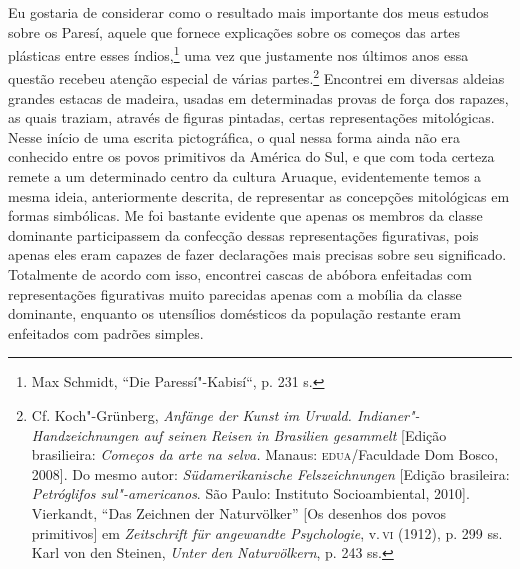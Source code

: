 Eu gostaria de considerar como o resultado mais importante dos meus
estudos sobre os Paresí, aquele que fornece explicações sobre os
começos das artes plásticas entre esses índios,\footnote{Max Schmidt,
  ``Die Paressí"-Kabisí``, p. 231 s.} uma vez que justamente nos últimos
anos essa questão recebeu atenção especial de várias partes.\footnote{Cf.
  Koch"-Grünberg, \emph{Anfänge der Kunst im Urwald.
  Indianer"-Handzeichnungen auf seinen Reisen in Brasilien gesammelt}
  {[}Edição brasilieira: \emph{Começos da arte na selva.} Manaus:
  \textsc{edua}/Faculdade Dom Bosco, 2008{]}. Do mesmo autor:
  \emph{Südamerikanische Felszeichnungen} {[}Edição brasileira:
  \emph{Petróglifos sul"-americanos}. São Paulo: Instituto
  Socioambiental, 2010{]}. Vierkandt, ``Das Zeichnen der Naturvölker''
  {[}Os desenhos dos povos primitivos{]} em \emph{Zeitschrift für
  angewandte Psychologie}, v.\,\textsc{vi} (1912), p. 299 ss. Karl von den
  Steinen, \emph{Unter den Naturvölkern}, p. 243 ss.} Encontrei em
diversas aldeias grandes estacas de madeira, usadas em determinadas
provas de força dos rapazes, as quais traziam, através de figuras
pintadas, certas representações mitológicas. Nesse início de uma escrita
pictográfica, o qual nessa forma ainda não era conhecido entre os povos
primitivos da América do Sul, e que com toda certeza remete a um
determinado centro da cultura Aruaque, evidentemente temos a mesma
ideia, anteriormente descrita, de representar as concepções mitológicas
em formas simbólicas. Me foi bastante evidente que apenas os membros da
classe dominante participassem da confecção dessas representações
figurativas, pois apenas eles eram capazes de fazer declarações mais
precisas sobre seu significado. Totalmente de acordo com isso, encontrei
cascas de abóbora enfeitadas com representações figurativas muito
parecidas apenas com a mobília da classe dominante, enquanto os
utensílios domésticos da população restante eram enfeitados com padrões
simples.

